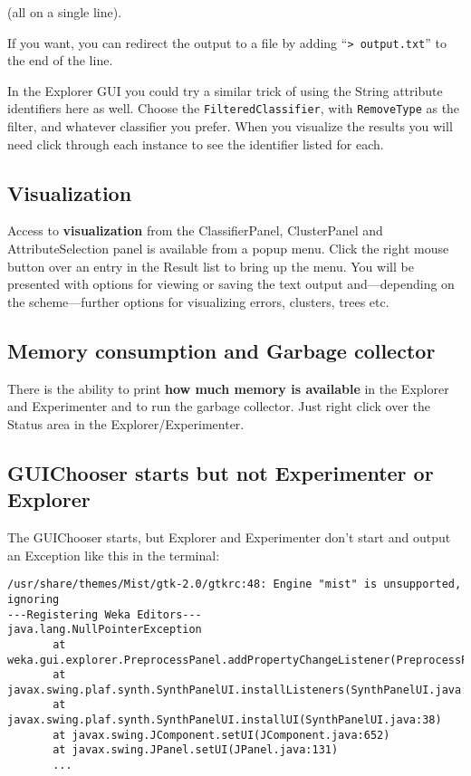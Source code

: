 \noindent (all on a single line).

If you want, you can redirect the output to a file by adding
``\verb=> output.txt='' to the end of the line.

In the Explorer GUI you could try a similar trick of using the String
attribute identifiers here as well. Choose the \verb=FilteredClassifier=,
with \verb=RemoveType= as the filter, and whatever classifier you
prefer. When you visualize the results you will need click through
each instance to see the identifier listed for each.

\subsection{Visualization}
Access to \textbf{visualization} from the ClassifierPanel, ClusterPanel and
AttributeSelection panel is available from a popup menu. Click the
right mouse button over an entry in the Result list to bring up the
menu. You will be presented with options for viewing or saving the
text output and---depending on the scheme---further options for
visualizing errors, clusters, trees etc.

\subsection{Memory consumption and Garbage collector}
There is the ability to print \textbf{how much memory is available} in the
Explorer and Experimenter and to run the garbage collector. Just right
click over the Status area in the Explorer/Experimenter.

\subsection{GUIChooser starts but not Experimenter or Explorer}
\label{GUIChooserButNotExplorer}
The GUIChooser starts, but Explorer and Experimenter don't start and
output an Exception like this in the terminal:

\begin{verbatim}
/usr/share/themes/Mist/gtk-2.0/gtkrc:48: Engine "mist" is unsupported, ignoring
---Registering Weka Editors---
java.lang.NullPointerException
       at weka.gui.explorer.PreprocessPanel.addPropertyChangeListener(PreprocessPanel.java:519)
       at javax.swing.plaf.synth.SynthPanelUI.installListeners(SynthPanelUI.java:49)
       at javax.swing.plaf.synth.SynthPanelUI.installUI(SynthPanelUI.java:38)
       at javax.swing.JComponent.setUI(JComponent.java:652)
       at javax.swing.JPanel.setUI(JPanel.java:131) 
       ...
\end{verbatim}

